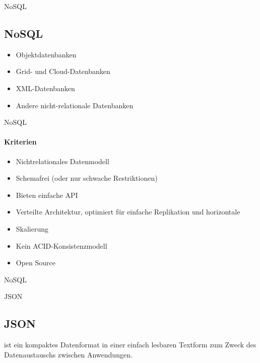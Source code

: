 \documentclass[11pt]{beamer}
\begin{document}
\begin{frame}{NoSQL}
\subsection{NoSQL}
\begin{itemize}
\item Objektdatenbanken
\item Grid- und Cloud-Datenbanken
\item XML-Datenbanken
\item Andere nicht-relationale Datenbanken
\end{itemize}
\end{frame}

\begin{frame}{NoSQL}
\framesubtitle{Kriterien}
\begin{itemize}
\item Nichtrelationales Datenmodell
\item Schemafrei (oder nur schwache Restriktionen)
\item Bieten einfache API
\item Verteilte Architektur, optimiert für einfache Replikation und horizontale \item Skalierung
\item Kein ACID-Konsistenzmodell
\item Open Source
\end{itemize}
\end{frame}

\begin{frame}{NoSQL}
\begin{figure}
\end{figure}
\end{frame}

\begin{frame}{JSON}
\subsection{JSON}
 ist ein kompaktes Datenformat in einer einfach lesbaren Textform zum Zweck des Datenaustauschs zwischen Anwendungen.

\end{frame}
\end{document}
